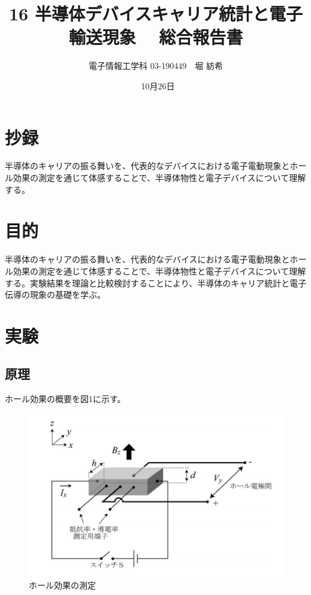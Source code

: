 \documentclass[dvipdfmx]{jsarticle}
\begin{document}
\title{16 半導体デバイスキャリア統計と電子輸送現象　 総合報告書}
\author{電子情報工学科 03-190449　堀 紡希}
\date{\ 10月26日}
\maketitle


\section{抄録}
半導体のキャリアの振る舞いを、代表的なデバイスにおける電子電動現象とホール効果の測定を通じて体感することで、半導体物性と電子デバイスについて理解する。
\section{目的}
半導体のキャリアの振る舞いを、代表的なデバイスにおける電子電動現象とホール効果の測定を通じて体感することで、半導体物性と電子デバイスについて理解する。実験結果を理論と比較検討することにより、半導体のキャリア統計と電子伝導の現象の基礎を学ぶ。
\section{実験}

\subsection{原理}
ホール効果の概要を図1に示す。
\begin{figure}[H]
\begin{center}
\includegraphics[scale = 0.6]{figure1.png}
\caption{ホール効果の測定}
\end{center}
\end{figure}
\end{document}
